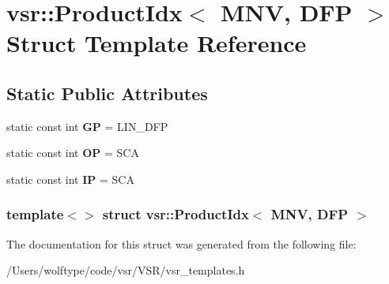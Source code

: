 \hypertarget{structvsr_1_1_product_idx_3_01_m_n_v_00_01_d_f_p_01_4}{\section{vsr\-:\-:Product\-Idx$<$ M\-N\-V, D\-F\-P $>$ Struct Template Reference}
\label{structvsr_1_1_product_idx_3_01_m_n_v_00_01_d_f_p_01_4}
}
\subsection*{Static Public Attributes}
\begin{DoxyCompactItemize}
\item 
\hypertarget{structvsr_1_1_product_idx_3_01_m_n_v_00_01_d_f_p_01_4_a3b861fd6aff6164709ae9a9a16013d97}{static const int {\bfseries G\-P} = L\-I\-N\-\_\-\-D\-F\-P}\label{structvsr_1_1_product_idx_3_01_m_n_v_00_01_d_f_p_01_4_a3b861fd6aff6164709ae9a9a16013d97}

\item 
\hypertarget{structvsr_1_1_product_idx_3_01_m_n_v_00_01_d_f_p_01_4_a7e8b5be6a99bd4fd65e690ceb169c1fa}{static const int {\bfseries O\-P} = S\-C\-A}\label{structvsr_1_1_product_idx_3_01_m_n_v_00_01_d_f_p_01_4_a7e8b5be6a99bd4fd65e690ceb169c1fa}

\item 
\hypertarget{structvsr_1_1_product_idx_3_01_m_n_v_00_01_d_f_p_01_4_ace444a802840b5d14d75986aa32fd25c}{static const int {\bfseries I\-P} = S\-C\-A}\label{structvsr_1_1_product_idx_3_01_m_n_v_00_01_d_f_p_01_4_ace444a802840b5d14d75986aa32fd25c}

\end{DoxyCompactItemize}
\subsubsection*{template$<$$>$ struct vsr\-::\-Product\-Idx$<$ M\-N\-V, D\-F\-P $>$}



The documentation for this struct was generated from the following file\-:\begin{DoxyCompactItemize}
\item 
/\-Users/wolftype/code/vsr/\-V\-S\-R/vsr\-\_\-templates.\-h\end{DoxyCompactItemize}
